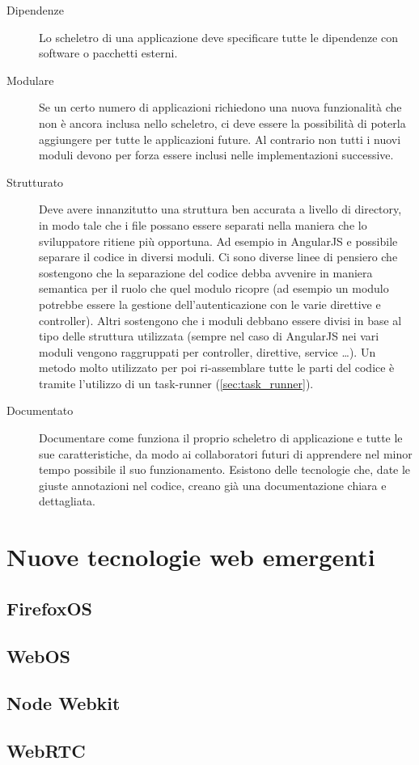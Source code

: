 \begin{description}
\item[Dipendenze] Lo scheletro di una applicazione deve specificare tutte le dipendenze con software o pacchetti esterni.

\item[Modulare] Se un certo numero di applicazioni richiedono una nuova funzionalità che non è ancora inclusa nello scheletro, ci deve essere la possibilità di poterla aggiungere per tutte le applicazioni future. Al contrario non tutti i nuovi moduli devono per forza essere inclusi nelle implementazioni successive.

\item[Strutturato] Deve avere innanzitutto una struttura ben accurata a livello di directory, in modo tale che i file possano essere separati nella maniera che lo sviluppatore ritiene più opportuna. Ad esempio in AngularJS e possibile separare il codice in diversi moduli. Ci sono diverse linee di pensiero che sostengono che la separazione del codice debba avvenire in maniera semantica per il ruolo che quel modulo ricopre (ad esempio un modulo potrebbe essere la gestione dell'autenticazione con le varie direttive e controller). Altri sostengono che i moduli debbano essere divisi in base al tipo delle struttura utilizzata (sempre nel caso di AngularJS nei vari moduli vengono raggruppati per controller, direttive, service \ldots).
Un metodo molto utilizzato per poi ri-assemblare tutte le parti del codice è tramite l'utilizzo di un task-runner (\ref{sec:task_runner}).

\item[Documentato] Documentare come funziona il proprio scheletro di applicazione e tutte le sue caratteristiche, da modo ai collaboratori futuri di apprendere nel minor tempo possibile il suo funzionamento. Esistono delle tecnologie che, date le giuste annotazioni nel codice, creano già una documentazione chiara e dettagliata.
\end{description} 

\section{Nuove tecnologie web emergenti}

\subsection{FirefoxOS}

\subsection{WebOS}

\subsection{Node Webkit}

\subsection{WebRTC}